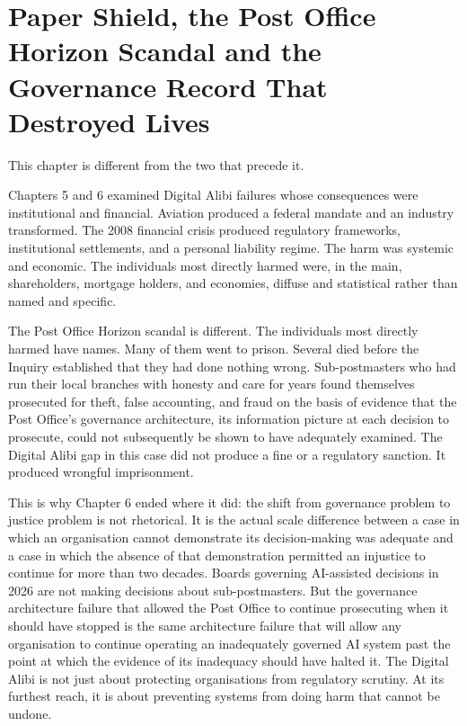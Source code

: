 
\chapter{Paper Shield, the Post Office Horizon Scandal and the Governance Record That Destroyed Lives}

This chapter is different from the two that precede it.

Chapters 5 and 6 examined Digital Alibi failures whose consequences were institutional and financial. Aviation produced a federal mandate and an industry transformed. The 2008 financial crisis produced regulatory frameworks, institutional settlements, and a personal liability regime. The harm was systemic and economic. The individuals most directly harmed were, in the main, shareholders, mortgage holders, and economies, diffuse and statistical rather than named and specific.

The Post Office Horizon scandal is different. The individuals most directly harmed have names. Many of them went to prison. Several died before the Inquiry established that they had done nothing wrong. Sub-postmasters who had run their local branches with honesty and care for years found themselves prosecuted for theft, false accounting, and fraud on the basis of evidence that the Post Office's governance architecture, its information picture at each decision to prosecute, could not subsequently be shown to have adequately examined. The Digital Alibi gap in this case did not produce a fine or a regulatory sanction. It produced wrongful imprisonment.

This is why Chapter 6 ended where it did: the shift from governance problem to justice problem is not rhetorical. It is the actual scale difference between a case in which an organisation cannot demonstrate its decision-making was adequate and a case in which the absence of that demonstration permitted an injustice to continue for more than two decades. Boards governing AI-assisted decisions in 2026 are not making decisions about sub-postmasters. But the governance architecture failure that allowed the Post Office to continue prosecuting when it should have stopped is the same architecture failure that will allow any organisation to continue operating an inadequately governed AI system past the point at which the evidence of its inadequacy should have halted it. The Digital Alibi is not just about protecting organisations from regulatory scrutiny. At its furthest reach, it is about preventing systems from doing harm that cannot be undone.

